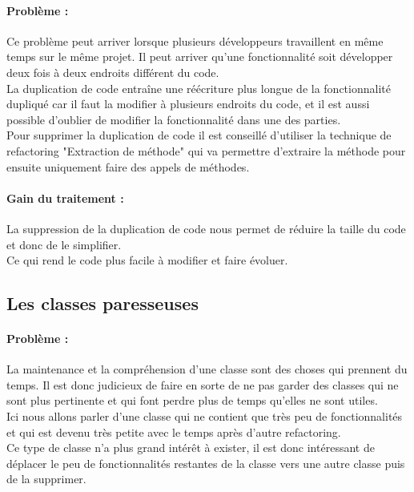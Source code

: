 \documentclass[a4paper,twoside,12pt,openright]{report}
\begin{document}
\paragraph{Problème :}
Ce problème peut arriver lorsque plusieurs développeurs travaillent en même temps sur le même projet. Il peut arriver qu'une fonctionnalité soit développer deux fois à deux endroits différent du code.\\
La duplication de code entraîne une réécriture plus longue de la fonctionnalité dupliqué car il faut la modifier à plusieurs endroits du code, et il est aussi possible d'oublier de modifier la fonctionnalité dans une des parties.\\
Pour supprimer la duplication de code il est conseillé d'utiliser la technique de refactoring "Extraction de méthode" qui va permettre d'extraire la méthode pour ensuite uniquement faire des appels de méthodes.\\

\paragraph{Gain du traitement :}
La suppression de la duplication de code nous permet de réduire la taille du code et donc de le simplifier.\\
Ce qui rend le code plus facile à modifier et faire évoluer.\\

\subsection{Les classes paresseuses}
\paragraph{Problème :}
La maintenance et la compréhension d'une classe sont des choses qui prennent du temps. Il est donc judicieux de faire en sorte de ne pas garder des classes qui ne sont plus pertinente et qui font perdre plus de temps qu'elles ne sont utiles.\\
Ici nous allons parler d'une classe qui ne contient que très peu de fonctionnalités et qui est devenu très petite avec le temps après d'autre refactoring.\\


Ce type de classe n'a plus grand intérêt à exister, il est donc intéressant de déplacer le peu de fonctionnalités restantes de la classe vers une autre classe puis de la supprimer.\\
\end{document}
